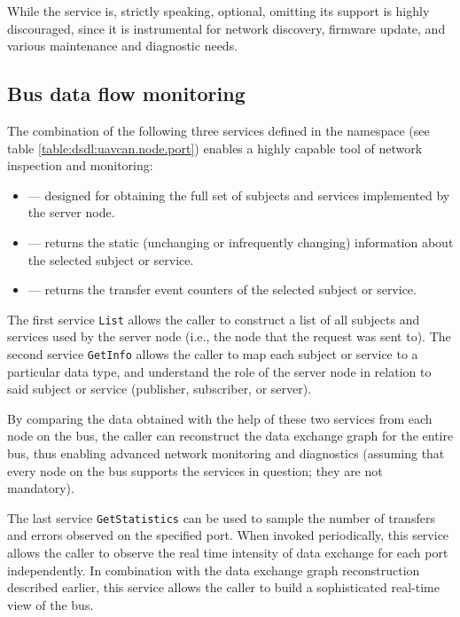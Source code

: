 While the service is, strictly speaking, optional, omitting its support is highly discouraged,
since it is instrumental for network discovery, firmware update, and various maintenance and diagnostic needs.


\subsection{Bus data flow monitoring}

The combination of the following three services defined in the namespace 
(see table \ref{table:dsdl:uavcan.node.port}) enables a highly capable tool of network inspection and monitoring:
\begin{itemize}
    \item {} --- designed for obtaining the full set of subjects and services
    implemented by the server node.

    \item {} --- returns the static (unchanging or infrequently changing)
    information about the selected subject or service.

    \item {} --- returns the transfer event counters of
    the selected subject or service.
\end{itemize}

The first service \verb|List| allows the caller to construct a list of all subjects and services used by the
server node (i.e., the node that the request was sent to).
The second service \verb|GetInfo| allows the caller to map each subject or service to a particular data type,
and understand the role of the server node in relation to said subject or service
(publisher, subscriber, or server).

By comparing the data obtained with the help of these two services from each node on the bus,
the caller can reconstruct the data exchange graph for the entire bus,
thus enabling advanced network monitoring and diagnostics
(assuming that every node on the bus supports the services in question; they are not mandatory).

The last service \verb|GetStatistics| can be used to sample the number of transfers and errors observed
on the specified port.
When invoked periodically, this service allows the caller to observe the real time intensity of data exchange
for each port independently.
In combination with the data exchange graph reconstruction described earlier,
this service allows the caller to build a sophisticated real-time view of the bus.

